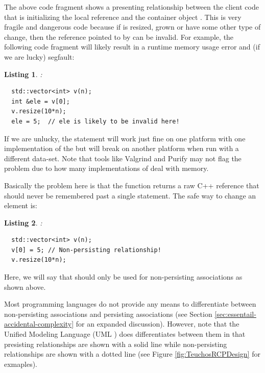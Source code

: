 \documentclass[pdf,ps2pdf,11pt]{SANDreport}
\newtheorem{listing}{Listing}
\begin{document}
The above code fragment shows a presenting relationship between the
client code that is initializing the local reference {}
and the {} container object {}.  This is
very fragile and dangerous code because if {} is resized,
grown or have some other type of change, then the reference pointed to
by {} can be invalid.  For example, the following code
fragment will likely result in a runtime memory usage error and (if
we are lucky) segfault:

\begin{listing}:\\
{\small\begin{verbatim}
  std::vector<int> v(n);
  int &ele = v[0];
  v.resize(10*n);
  ele = 5;  // ele is likely to be invalid here!
\end{verbatim}}
\end{listing}

If we are unlucky, the statement {} will work just
fine on one platform with one implementation of the
{} but will break on another platform when run
with a different data-set.  Note that tools like Valgrind and Purify
may not flag the problem due to how many implementations of
{} deal with memory.

Basically the problem here is that the
{} function returns a raw
C++ reference that should never be remembered past a single statement.
The safe way to change an element is:

\begin{listing}:\\
{\small\begin{verbatim}
  std::vector<int> v(n);
  v[0] = 5; // Non-persisting relationship!
  v.resize(10*n);
\end{verbatim}}
\end{listing}

Here, we will say that {}
should only be used for non-persisting associations as shown above.

Most programming languages do not provide any means to differentiate
between non-persisting associations and persisting associations (see
Section {}\ref{sec:essentail-accidental-complexity} for an expanded
discussion).  However, note that the Unified Modeling Language (UML
{}\cite{UMLDistilledThirdEdition04}) does differentiates between them
in that presisting relationships are shown with a solid line while
non-persisting relationships are shown with a dotted line (see Figure
{}\ref{fig:TeuchosRCPDesign} for exmaples).
\end{document}
